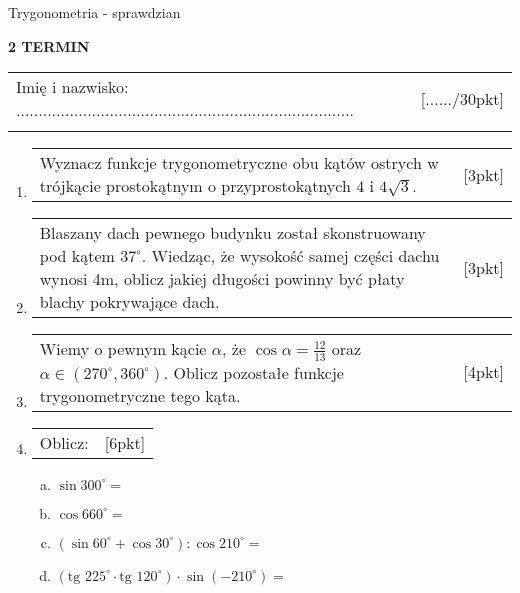 \documentclass[12pt,a4paper]{article}
\begin{document}
	\begin{center}
		\LARGE Trygonometria - sprawdzian
	\end{center}
	\vspace{1.5cm}
	\begin{flushright}
		\textbf{2 TERMIN}
	\end{flushright}
	\begin{tabular}{p{13cm} r}
		Imię i nazwisko: ............................................................................
		&[....../30pkt]\\ 
		\vspace{0.5cm}
	\end{tabular}
	\begin{enumerate}[1.]
		\item  \begin{tabular}{p{13cm} r}
			Wyznacz funkcje trygonometryczne obu kątów ostrych w trójkącie prostokątnym o przyprostokątnych $4$ i $4\sqrt{3}$. &[3pkt]\\ 
		\end{tabular}
		
		\item  \begin{tabular}{p{13cm} r}
			Blaszany dach pewnego budynku został skonstruowany pod kątem $37^\circ$. Wiedząc, że wysokość samej części dachu wynosi 4m, oblicz jakiej długości powinny być płaty blachy pokrywające dach. 
			&[3pkt]\\ 
		\end{tabular}
		
		\item \begin{tabular}{p{13cm} r}
			Wiemy o pewnym kącie $\alpha$, że $\cos \alpha = \frac{12}{13}$ oraz $\alpha\in (270^\circ,360^\circ)$. Oblicz pozostałe funkcje trygonometryczne tego kąta.
			&[4pkt]\\
		\end{tabular}
		
		\item \begin{tabular}{p{13cm} r}
			Oblicz: &[6pkt]\\ 
		\end{tabular}
		\begin{enumerate}[a)]
			\item $\sin300^\circ=$
			\item $\cos 660^\circ= $
			\item $(\sin 60^\circ + \cos 30^\circ) : \cos210^\circ= $
			\item $(\text{tg }225^\circ \cdot \text{tg } 120^\circ) \cdot \sin (-210^\circ)=$
		\end{enumerate}
		

\end{enumerate}
\end{document}
